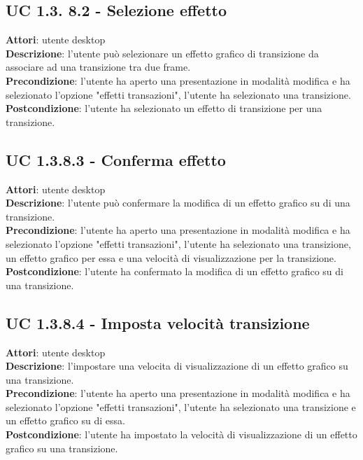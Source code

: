\subsection{UC 1.3. 8.2 - Selezione effetto}{
	\label{uc1.3.8.2}
	\textbf{Attori}: utente desktop \\
	\textbf{Descrizione}: l'utente può selezionare un effetto grafico di transizione da associare ad una transizione tra due frame. \\
	\textbf{Precondizione}: l'utente ha aperto una presentazione in modalità modifica e ha selezionato l'opzione "effetti transazioni", l'utente ha selezionato una transizione.	\\
	\textbf{Postcondizione}: l'utente ha selezionato un effetto di transizione per una transizione.	\\
}
\subsection{UC 1.3.8.3 - Conferma effetto}{
	\label{uc1.3.8.3}
	\textbf{Attori}: utente desktop \\
	\textbf{Descrizione}: l'utente può confermare la modifica di un effetto grafico su di una transizione. \\
	\textbf{Precondizione}: l'utente ha aperto una presentazione in modalità modifica e ha selezionato l'opzione "effetti transazioni", l'utente ha selezionato una transizione, un effetto grafico per essa e una velocità di visualizzazione per la transizione.	\\
	\textbf{Postcondizione}: l'utente ha confermato la modifica di un effetto grafico su di una transizione.	\\
}
\subsection{UC 1.3.8.4 - Imposta velocità transizione}{
	\label{uc1.3..8.4}
	\textbf{Attori}: utente desktop \\
	\textbf{Descrizione}: l'impostare una velocita di visualizzazione di un effetto grafico su una transizione. \\
	\textbf{Precondizione}: l'utente ha aperto una presentazione in modalità modifica e ha selezionato l'opzione "effetti transazioni", l'utente ha selezionato una transizione e un effetto grafico su di essa.	\\
	\textbf{Postcondizione}: l'utente ha impostato la velocità di visualizzazione di un effetto grafico su una transizione.	\\
}
